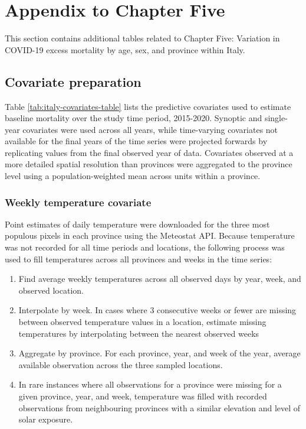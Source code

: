 \documentclass[
]{report}
\providecommand{\tightlist}{%
  \setlength{\itemsep}{0pt}\setlength{\parskip}{0pt}}
\begin{document}
\hypertarget{appendix-to-chapter-five}{%
\chapter{Appendix to Chapter Five}\label{appendix-to-chapter-five}}

This section contains additional tables related to Chapter Five: Variation in COVID-19 excess mortality by age, sex, and province within Italy.

\hypertarget{covariate-preparation}{%
\section*{Covariate preparation}\label{covariate-preparation}}

Table \ref{tab:italy-covariates-table} lists the predictive covariates used to estimate baseline mortality over the study time period, 2015-2020. Synoptic and single-year covariates were used across all years, while time-varying covariates not available for the final years of the time series were projected forwards by replicating values from the final observed year of data. Covariates observed at a more detailed spatial resolution than provinces were aggregated to the province level using a population-weighted mean across units within a province.

\hypertarget{weekly-temperature-covariate}{%
\subsection*{Weekly temperature covariate}\label{weekly-temperature-covariate}}

Point estimates of daily temperature were downloaded for the three most populous pixels in each province using the Meteostat API. Because temperature was not recorded for all time periods and locations, the following process was used to fill temperatures across all provinces and weeks in the time series:

\begin{enumerate}
\def\labelenumi{\arabic{enumi}.}
\tightlist
\item
  Find average weekly temperatures across all observed days by year, week, and observed location.
\item
  Interpolate by week. In cases where 3 consecutive weeks or fewer are missing between observed temperature values in a location, estimate missing temperatures by interpolating between the nearest observed weeks
\item
  Aggregate by province. For each province, year, and week of the year, average available observation across the three sampled locations.
\item
  In rare instances where all observations for a province were missing for a given province, year, and week, temperature was filled with recorded observations from neighbouring provinces with a similar elevation and level of solar exposure.
\end{enumerate}
\end{document}
